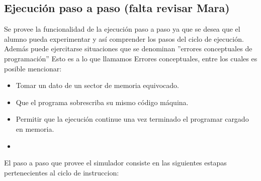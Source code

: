 \subsection{Ejecución paso a paso (falta revisar Mara)}

Se provee la funcionalidad de la ejecución paso a paso ya que se desea que el alumno pueda experimentar y así comprender los pasos del ciclo de ejecución. Además puede ejercitarse situaciones que se denominan ''errores conceptuales de programación'' Esto es a lo que llamamos Errores conceptuales, entre los cuales es posible mencionar:

\begin{itemize}
\item Tomar un dato de un sector de memoria equivocado.
\item Que el programa sobrescriba su mismo código máquina.
\item Permitir que la ejecución continue una vez terminado el programar cargado en memoria.
\item 
\end{itemize}

El paso a paso que provee el simulador consiste en las siguientes estapas pertenecientes al ciclo de instruccion:

